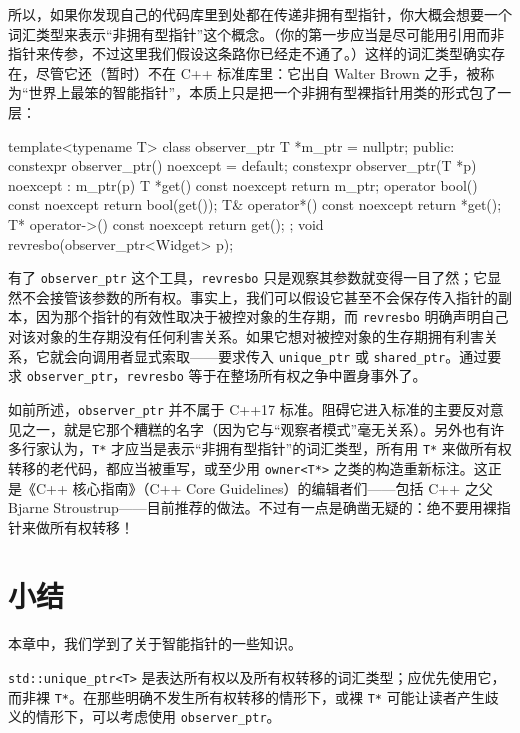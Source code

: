 所以，如果你发现自己的代码库里到处都在传递非拥有型指针，你大概会想要一个词汇类型来表示“非拥有型指针”这个概念。（你的第一步应当是尽可能用引用而非指针来传参，不过这里我们假设这条路你已经走不通了。）这样的词汇类型确实存在，尽管它还（暂时）不在 C++ 标准库里：它出自 Walter Brown 之手，被称为“世界上最笨的智能指针”，本质上只是把一个非拥有型裸指针用类的形式包了一层：

\begin{codebox}[cpp]
    template<typename T>
    class observer_ptr {
      T *m_ptr = nullptr;
      public:
      constexpr observer_ptr() noexcept = default;
      constexpr observer_ptr(T *p) noexcept : m_ptr(p) {}
      T *get() const noexcept { return m_ptr; }
      operator bool() const noexcept { return bool(get()); }
      T& operator*() const noexcept { return *get(); }
      T* operator->() const noexcept { return get(); }
    };
    void revresbo(observer_ptr<Widget> p);
\end{codebox}

有了 \texttt{observer\_\allowbreak{}ptr} 这个工具，\texttt{revresbo} 只是观察其参数就变得一目了然；它显然不会接管该参数的所有权。事实上，我们可以假设它甚至不会保存传入指针的副本，因为那个指针的有效性取决于被控对象的生存期，而 \texttt{revresbo} 明确声明自己对该对象的生存期没有任何利害关系。如果它想对被控对象的生存期拥有利害关系，它就会向调用者显式索取——要求传入 \texttt{unique\_\allowbreak{}ptr} 或 \texttt{shared\_\allowbreak{}ptr}。通过要求 \texttt{observer\_\allowbreak{}ptr}，\texttt{revresbo} 等于在整场所有权之争中置身事外了。

如前所述，\texttt{observer\_\allowbreak{}ptr} 并不属于 C++17 标准。阻碍它进入标准的主要反对意见之一，就是它那个糟糕的名字（因为它与“观察者模式”毫无关系）。另外也有许多行家认为，\texttt{T*} 才应当是表示“非拥有型指针”的词汇类型，所有用 \texttt{T*} 来做所有权转移的老代码，都应当被重写，或至少用 \texttt{owner<\allowbreak{}T*>} 之类的构造重新标注。这正是《C++ 核心指南》（C++ Core Guidelines）的编辑者们——包括 C++ 之父 Bjarne Stroustrup——目前推荐的做法。不过有一点是确凿无疑的：绝不要用裸指针来做所有权转移！

\section{小结}

本章中，我们学到了关于智能指针的一些知识。

\texttt{std::\allowbreak{}unique\_\allowbreak{}ptr<\allowbreak{}T>\allowbreak{}} 是表达所有权以及所有权转移的词汇类型；应优先使用它，而非裸 \texttt{T*}。在那些明确不发生所有权转移的情形下，或裸 \texttt{T*} 可能让读者产生歧义的情形下，可以考虑使用 \texttt{observer\_\allowbreak{}ptr}。

